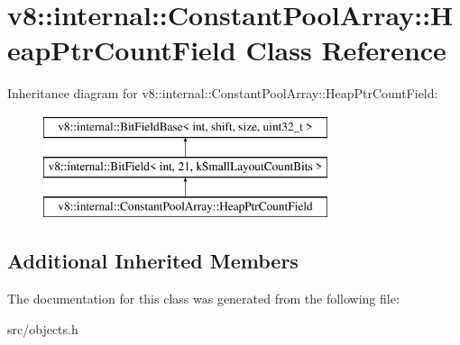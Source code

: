 \hypertarget{classv8_1_1internal_1_1_constant_pool_array_1_1_heap_ptr_count_field}{}\section{v8\+:\+:internal\+:\+:Constant\+Pool\+Array\+:\+:Heap\+Ptr\+Count\+Field Class Reference}
\label{classv8_1_1internal_1_1_constant_pool_array_1_1_heap_ptr_count_field}
Inheritance diagram for v8\+:\+:internal\+:\+:Constant\+Pool\+Array\+:\+:Heap\+Ptr\+Count\+Field\+:\begin{figure}[H]
\begin{center}
\leavevmode
\includegraphics[height=3.000000cm]{classv8_1_1internal_1_1_constant_pool_array_1_1_heap_ptr_count_field}
\end{center}
\end{figure}
\subsection*{Additional Inherited Members}


The documentation for this class was generated from the following file\+:\begin{DoxyCompactItemize}
\item 
src/objects.\+h\end{DoxyCompactItemize}
